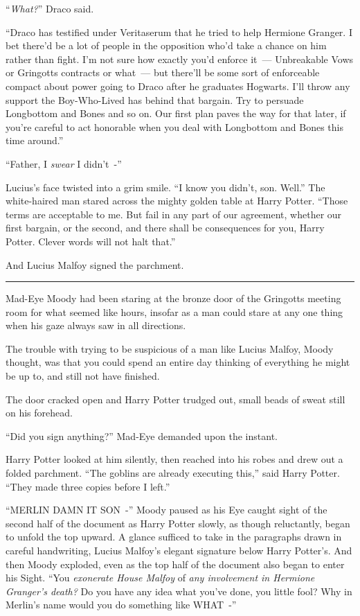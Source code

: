 ``\emph{What?}'' Draco said.

``Draco has testified under Veritaserum that he tried to help Hermione Granger. I bet there'd be a lot of people in the opposition who'd take a chance on him rather than fight. I'm not sure how exactly you'd enforce it~--- Unbreakable Vows or Gringotts contracts or what~--- but there'll be some sort of enforceable compact about power going to Draco after he graduates Hogwarts. I'll throw any support the Boy-Who-Lived has behind that bargain. Try to persuade Longbottom and Bones and so on. Our first plan paves the way for that later, if you're careful to act honorable when you deal with Longbottom and Bones this time around.''

``Father, I \emph{swear} I didn't~-''

Lucius's face twisted into a grim smile. ``I know you didn't, son. Well.'' The white-haired man stared across the mighty golden table at Harry Potter. ``Those terms are acceptable to me. But fail in any part of our agreement, whether our first bargain, or the second, and there shall be consequences for you, Harry Potter. Clever words will not halt that.''

And Lucius Malfoy signed the parchment.

\begin{center}\rule{3in}{0.4pt}\end{center}

Mad-Eye Moody had been staring at the bronze door of the Gringotts meeting room for what seemed like hours, insofar as a man could stare at any one thing when his gaze always saw in all directions.

The trouble with trying to be suspicious of a man like Lucius Malfoy, Moody thought, was that you could spend an entire day thinking of everything he might be up to, and still not have finished.

The door cracked open and Harry Potter trudged out, small beads of sweat still on his forehead.

``Did you sign anything?'' Mad-Eye demanded upon the instant.

Harry Potter looked at him silently, then reached into his robes and drew out a folded parchment. ``The goblins are already executing this,'' said Harry Potter. ``They made three copies before I left.''

``MERLIN DAMN IT SON~-'' Moody paused as his Eye caught sight of the second half of the document as Harry Potter slowly, as though reluctantly, began to unfold the top upward. A glance sufficed to take in the paragraphs drawn in careful handwriting, Lucius Malfoy's elegant signature below Harry Potter's. And then Moody exploded, even as the top half of the document also began to enter his Sight. ``You \emph{exonerate House Malfoy} of \emph{any involvement in Hermione Granger's death?} Do you have any idea what you've done, you little fool? Why in Merlin's name would you do something like WHAT~-''
